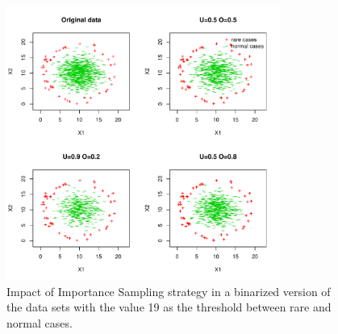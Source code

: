 \documentclass[10pt,a4paper]{article}\usepackage[]{graphicx}\usepackage[]{color}
\newenvironment{knitrout}{}{} %
\begin{document}
\begin{knitrout}\footnotesize
{}\color{fgcolor}\begin{figure}

{\centering \includegraphics[width=0.8\textwidth]{figures/UBL-IS_plot4-1} 

}

\caption[Impact of Importance Sampling strategy in a binarized version of the data sets with the value 19 as the threshold between rare and normal cases]{Impact of Importance Sampling strategy in a binarized version of the data sets with the value 19 as the threshold between rare and normal cases.}\label{fig:IS_plot4}
\end{figure}


\end{knitrout}
\end{document}

